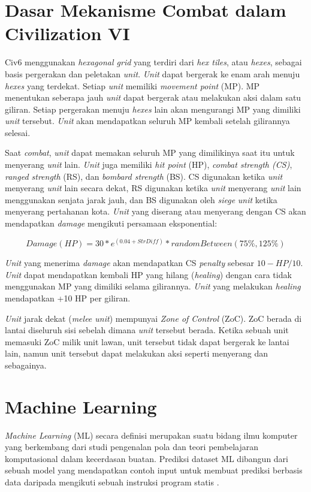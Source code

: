 \section{Dasar Mekanisme Combat dalam Civilization VI}
Civ6 menggunakan \emph{hexagonal grid} yang terdiri dari \emph{hex tiles}, atau \emph{hexes}, sebagai basis pergerakan dan peletakan \emph{unit}. 
\emph{Unit} dapat bergerak ke enam arah menuju \emph{hexes} yang terdekat. Setiap \emph{unit} memiliki \emph{movement point} (MP). 
MP menentukan seberapa jauh \emph{unit} dapat bergerak atau melakukan aksi dalam satu giliran. 
Setiap pergerakan menuju \emph{hexes} lain akan mengurangi MP yang dimiliki \emph{unit} tersebut.
\emph{Unit} akan mendapatkan seluruh MP kembali setelah gilirannya selesai.

Saat \emph{combat}, \emph{unit} dapat memakan seluruh MP yang dimilikinya saat itu untuk menyerang \emph{unit} lain.
\emph{Unit} juga memiliki \emph{hit point} (HP), \emph{combat strength (CS)}, \emph{ranged strength} (RS), dan \emph{bombard strength} (BS).
CS digunakan ketika \emph{unit} menyerang \emph{unit} lain secara dekat, RS digunakan ketika \emph{unit} menyerang \emph{unit} lain menggunakan senjata jarak jauh, dan BS digunakan oleh \emph{siege} \emph{unit} ketika menyerang pertahanan kota.
\emph{Unit} yang diserang atau menyerang dengan CS akan mendapatkan \emph{damage} mengikuti persamaan eksponential\citep{civ6Combat}:

\[Damage(HP) = 30 * e^{(0.04+StrDiff)} * randomBetween(75\%, 125\%)\]

\emph{Unit} yang menerima \emph{damage} akan mendapatkan CS \emph{penalty} sebesar \(10 - HP/10\).
\emph{Unit} dapat mendapatkan kembali HP yang hilang (\emph{healing}) dengan cara tidak menggunakan MP yang dimiliki selama gilirannya.
\emph{Unit} yang melakukan \emph{healing} mendapatkan +10 HP per giliran.

\emph{Unit} jarak dekat (\emph{melee unit})  mempunyai \emph{Zone of Control} (ZoC). ZoC berada di lantai diseluruh sisi sebelah dimana 
\emph{unit} tersebut berada. Ketika sebuah unit memasuki ZoC milik unit lawan, unit tersebut tidak dapat bergerak ke lantai lain, namun
unit tersebut dapat melakukan aksi seperti menyerang dan sebagainya.

\section{Machine Learning}
\emph{Machine Learning} (ML) secara definisi merupakan suatu bidang ilmu komputer yang berkembang dari studi pengenalan pola dan teori pembelajaran komputasional dalam kecerdasan buatan. 
Prediksi dataset ML dibangun dari sebuah model yang mendapatkan contoh input untuk membuat prediksi berbasis data daripada mengikuti sebuah instruksi program statis \citep{machineL}.

